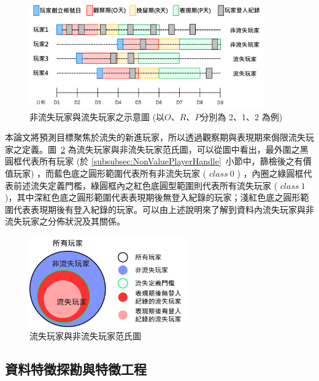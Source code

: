 \begin{figure}[!htb]
  \begin{center}
    \includegraphics[width=0.9\textwidth]{figures/Image_ClassPreparation.png}
    \caption[非流失玩家與流失玩家之示意圖]{非流失玩家與流失玩家之示意圖 (以$O$、$R$、$P$分別為 2、1、2 為例) }
    \label{fig:Image_ClassPreparation}
  \end{center}
\end{figure}

本論文將預測目標聚焦於流失的新進玩家，所以透過觀察期與表現期來侷限流失玩家之定義。圖~\ref{fig:Image_ClassVennChart} 為流失玩家與非流失玩家范氏圖，可以從圖中看出，最外圍之黑圓框代表所有玩家 (於 \ref{subsubsec:NonValuePlayerHandle}~小節中，篩檢後之有價值玩家) ，而藍色底之圓形範圍代表所有非流失玩家 ( $class\ 0$ ) ，內圈之綠圓框代表前述流失定義門檻，綠圓框內之紅色底圓型範圍則代表所有流失玩家 ( $class\ 1$ )，其中深紅色底之圓形範圍代表表現期後無登入紀錄的玩家；淺紅色底之圓形範圍代表表現期後有登入紀錄的玩家。可以由上述說明來了解到資料內流失玩家與非流失玩家之分佈狀況及其關係。

\begin{figure}[!htb]
  \begin{center}
    \includegraphics[width=0.6\textwidth]{figures/Image_ClassVennChart.png}
    \caption[流失玩家與非流失玩家范氏圖]{流失玩家與非流失玩家范氏圖}
    \label{fig:Image_ClassVennChart}
  \end{center}
\end{figure}

\subsection{資料特徵探勘與特徵工程}
\label{subsec:FeatureMining}


